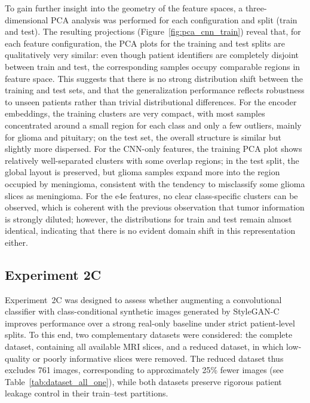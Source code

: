 To gain further insight into the geometry of the feature spaces, a three-dimensional PCA analysis was performed for each configuration and split (train and test). The resulting projections (Figure~\ref{fig:pca_cnn_train}) reveal that, for each feature configuration, the PCA plots for the training and test splits are qualitatively very similar: even though patient identifiers are completely disjoint between train and test, the corresponding samples occupy comparable regions in feature space. This suggests that there is no strong distribution shift between the training and test sets, and that the generalization performance reflects robustness to unseen patients rather than trivial distributional differences. For the encoder embeddings, the training clusters are very compact, with most samples concentrated around a small region for each class and only a few outliers, mainly for glioma and pituitary; on the test set, the overall structure is similar but slightly more dispersed. For the CNN-only features, the training PCA plot shows relatively well-separated clusters with some overlap regions; in the test split, the global layout is preserved, but glioma samples expand more into the region occupied by meningioma, consistent with the tendency to misclassify some glioma slices as meningioma. For the e4e features, no clear class-specific clusters can be observed, which is coherent with the previous observation that tumor information is strongly diluted; however, the distributions for train and test remain almost identical, indicating that there is no evident domain shift in this representation either.\\



\subsection{Experiment 2C}

\label{subsec:exp2c_discussion}

Experiment~2C was designed to assess whether augmenting a convolutional classifier with class-conditional synthetic images generated by StyleGAN-C improves performance over a strong real-only baseline under strict patient-level splits. To this end, two complementary datasets were considered: the complete dataset, containing all available MRI slices, and a reduced dataset, in which low-quality or poorly informative slices were removed. The reduced dataset thus excludes 761 images, corresponding to approximately 25\% fewer images (see Table~\ref{tab:dataset_all_one}), while both datasets preserve rigorous patient leakage control in their train--test partitions.\\

